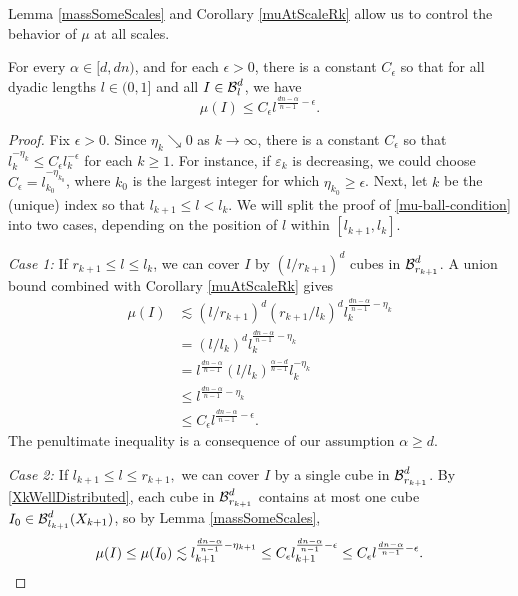 Lemma \ref{massSomeScales} and Corollary \ref{muAtScaleRk} allow us to control the behavior of $\mu$ at all scales. 

\begin{lemma} \label{frostmanBound}
	For every $\alpha \in [d, dn)$, and for each $\epsilon>0$, there is a constant $C_\epsilon$ so that for all dyadic lengths $l\in (0,1]$ and all $I \in \operatorname{\mathcal{B}}_l^d$, we have
	\begin{equation} 
		\mu(I) \leq C_{\epsilon} l^{\frac{dn - \alpha}{n - 1} - \epsilon}. \label{mu-ball-condition} 
	\end{equation} 
\end{lemma}
\begin{proof}
	Fix $\epsilon > 0$. Since $\eta_k \searrow 0$ as $k\to\infty$, there is a constant $C_{\epsilon}$ so that $l_k^{-\eta_k}\leq C_{\epsilon}l_k^{-\epsilon}$ for each $k \geq 1$. For instance, if $\varepsilon_k$ is decreasing, we could choose $C_{\epsilon}=l_{k_0}^{-\eta_{k_0}}$, where $k_0$ is the largest integer for which $\eta_{k_0} \geq \epsilon$. Next, let $k$ be the (unique) index so that $l_{k+1}\leq l < l_{k}$. We will split the proof of \eqref{mu-ball-condition} into two cases, depending on the position of  $l$ within $[l_{k+1}, l_k]$. 

	\emph{Case 1:} If $r_{k+1} \leq l \leq l_k$, we can cover $I$ by $(l/r_{k+1})^d$ cubes in $\operatorname{\mathcal{B}}^d_{r_{k+1}}$. A union bound combined with Corollary \ref{muAtScaleRk} gives
	\begin{equation}
	\begin{split}
	\mu(I) & \lesssim (l/r_{k+1})^d (r_{k+1}/l_k)^d l_k^{\frac{dn-\alpha}{n-1}-\eta_k} \\
	& = (l/l_k)^d l_k^{\frac{dn-\alpha}{n-1}-\eta_{k}}\\
	& = l^{\frac{dn-\alpha}{n-1}} (l/l_k)^{\frac{\alpha - d}{n-1}} l_k^{-\eta_k}\\
	& \leq l^{\frac{dn-\alpha}{n-1} - \eta_k}  \\
	& \leq C_{\epsilon}l^{\frac{dn-\alpha}{n-1}-\epsilon}.
	\end{split}
	\end{equation}
The penultimate inequality is a consequence of our assumption $\alpha \geq d$. 

	{\em{Case 2: }} If $l_{k+1} \leq l \leq r_{k+1},$ we can cover $I$ by a single cube in $\operatorname{\mathcal{B}}^d_{r_{k+1}}$. By \eqref{XkWellDistributed}, each cube in $\operatorname{\mathcal{B}}^d_{r_{k+1}}$ contains at most one cube $I_0 \in \operatorname{\mathcal{B}}^d_{l_{k+1}}(X_{k+1})$, so by Lemma \ref{massSomeScales},
	\[ 
		\mu(I) \leq \mu(I_0) \lesssim l_{k+1}^{\frac{dn - \alpha}{n - 1} - \eta_{k+1}} 
		\leq C_{\epsilon}l_{k+1}^{\frac{dn - \alpha}{n - 1} - \epsilon}
		\leq C_{\epsilon}l^{\frac{dn - \alpha}{n - 1} - \epsilon}.\qedhere
	\]

\end{proof}

